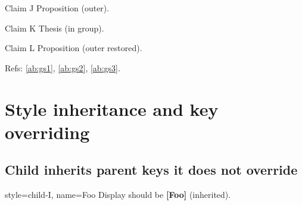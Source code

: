\documentclass{article}
\begin{document}

\begin{prop}
  \item[Claim J] Proposition (outer). \label{ab:gs1}
\end{prop}

\begingroup
  \begin{prop}
    \item[Claim K] Thesis (in group). \label{ab:gs2}
  \end{prop}
\endgroup

\begin{prop}
  \item[Claim L] Proposition (outer restored). \label{ab:gs3}
\end{prop}

Refs: \ref{ab:gs1}, \ref{ab:gs2}, \ref{ab:gs3}.

\section{Style inheritance and key overriding}


\subsection{Child inherits parent keys it does not override}



\begin{prop}
  \item[style=child-I, name=Foo]
    Display should be \textbf{[Foo]} (inherited).  \label{si:inherit1}
\end{prop}
\end{document}
